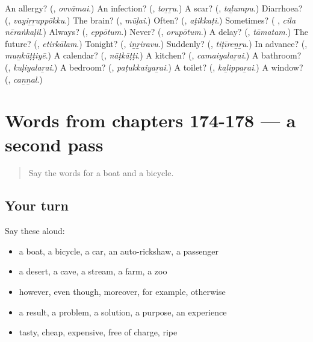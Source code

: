 \begin{tcolorbox}[breakable,colback=teal!4,colframe=teal!35!black,title={Before you move on}]
An allergy? (\textbf{}, \emph{ovvāmai}.) An infection? (\textbf{}, \emph{toṟṟu}.) A scar? (\textbf{}, \emph{taḻumpu}.) Diarrhoea? (\textbf{}, \emph{vayiṟṟuppōkku}.) The brain? (\textbf{}, \emph{mūḷai}.) Often? (\textbf{}, \emph{aṭikkaṭi}.) Sometimes? (\textbf{ }, \emph{cila nēraṅkaḷil}.) Always? (\textbf{}, \emph{eppōtum}.) Never? (\textbf{}, \emph{orupōtum}.) A delay? (\textbf{}, \emph{tāmatam}.) The future? (\textbf{}, \emph{etirkālam}.) Tonight? (\textbf{}, \emph{iṉṟiravu}.) Suddenly? (\textbf{}, \emph{tiṭīreṉṟu}.) In advance? (\textbf{}, \emph{muṉkūṭṭiyē}.) A calendar? (\textbf{}, \emph{nāṭkāṭṭi}.) A kitchen? (\textbf{}, \emph{camaiyalaṟai}.) A bathroom? (\textbf{}, \emph{kuḷiyalaṟai}.) A bedroom? (\textbf{}, \emph{paṭukkaiyaṟai}.) A toilet? (\textbf{}, \emph{kaḻippaṟai}.) A window? (\textbf{}, \emph{caṉṉal}.)
\end{tcolorbox}
\section[(dialogue)]{Words from chapters 174-178 — a second pass}

\label{lesson:TA-R178-second-pass-words-from-chapters-174-178}



\begin{quote}
Say the words for a boat and a bicycle.
\end{quote}

\subsection*{Your turn}
Say these aloud:

\begin{itemize}
\raggedright
  \item a boat, a bicycle, a car, an auto-rickshaw, a passenger
  \item a desert, a cave, a stream, a farm, a zoo
  \item however, even though, moreover, for example, otherwise
  \item a result, a problem, a solution, a purpose, an experience
  \item tasty, cheap, expensive, free of charge, ripe
\end{itemize}

